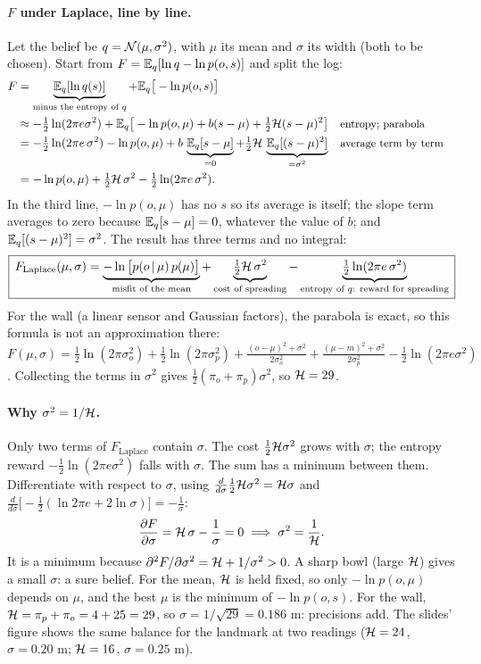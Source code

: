 \documentclass[11pt]{article}
\newcommand{\Fl}{F_{\text{Laplace}}}
\begin{document}
\paragraph{$F$ under Laplace, line by line.} Let the belief be $q = \mathcal{N}(\mu,\sigma^2)$, with $\mu$ its mean and $\sigma$ its width (both to be chosen). Start from $F = \mathbb{E}_q[\ln q - \ln p(o,s)]$ and split the log:
\begin{align*}
F &= \underbrace{\mathbb{E}_q[\ln q(s)]}_{\text{minus the entropy of }q} + \mathbb{E}_q\big[-\ln p(o,s)\big]\\
&\approx -\tfrac12\ln(2\pi e\sigma^2) + \mathbb{E}_q\big[-\ln p(o,\mu) + b(s-\mu) + \tfrac12\mathcal{H}(s-\mu)^2\big] && \text{\small entropy; parabola}\\
&= -\tfrac12\ln(2\pi e\,\sigma^2) - \ln p(o,\mu) + b\,\underbrace{\mathbb{E}_q[s-\mu]}_{=0} + \tfrac12\mathcal{H}\,\underbrace{\mathbb{E}_q[(s-\mu)^2]}_{=\sigma^2} && \text{\small average term by term}\\
&= -\ln p(o,\mu) + \tfrac12\mathcal{H}\,\sigma^2 - \tfrac12\ln(2\pi e\,\sigma^2) .
\end{align*}
In the third line, $-\ln p(o,\mu)$ has no $s$ so its average is itself; the slope term averages to zero because $\mathbb{E}_q[s-\mu] = 0$, whatever the value of $b$; and $\mathbb{E}_q[(s-\mu)^2] = \sigma^2$. The result has three terms and no integral:
\[
\boxed{\,\Fl(\mu,\sigma) = \underbrace{-\ln\big[p(o\given\mu)\,p(\mu)\big]}_{\text{misfit of the mean}} + \underbrace{\tfrac12\Hess\,\sigma^2}_{\text{cost of spreading}} - \underbrace{\tfrac12\ln(2\pi e\,\sigma^2)}_{\text{entropy of }q\text{: reward for spreading}}\,}
\]
For the wall (a linear sensor and Gaussian factors), the parabola is exact, so this formula is not an approximation there: $F(\mu,\sigma) = \tfrac12\ln(2\pi\sigma_o^2) + \tfrac12\ln(2\pi\sigma_p^2) + \frac{(o-\mu)^2 + \sigma^2}{2\sigma_o^2} + \frac{(\mu-m)^2+\sigma^2}{2\sigma_p^2} - \tfrac12\ln(2\pi e\sigma^2)$. Collecting the terms in $\sigma^2$ gives $\tfrac12(\pi_o+\pi_p)\sigma^2$, so $\mathcal{H} = 29$.

\paragraph{Why $\sigma^2 = 1/\mathcal{H}$.} Only two terms of $\Fl$ contain $\sigma$. The cost $\tfrac12\mathcal{H}\sigma^2$ grows with $\sigma$; the entropy reward $-\tfrac12\ln(2\pi e\sigma^2)$ falls with $\sigma$. The sum has a minimum between them. Differentiate with respect to $\sigma$, using $\tfrac{d}{d\sigma}\tfrac12\mathcal{H}\sigma^2 = \mathcal{H}\sigma$ and $\tfrac{d}{d\sigma}\big[-\tfrac12(\ln 2\pi e + 2\ln\sigma)\big] = -\tfrac1\sigma$:
\[
\frac{\partial F}{\partial\sigma} = \mathcal{H}\,\sigma - \frac{1}{\sigma} = 0 \;\Longrightarrow\; \sigma^2 = \frac{1}{\mathcal{H}}.
\]
It is a minimum because $\partial^2F/\partial\sigma^2 = \mathcal{H} + 1/\sigma^2 > 0$. A sharp bowl (large $\mathcal{H}$) gives a small $\sigma$: a sure belief. For the mean, $\mathcal{H}$ is held fixed, so only $-\ln p(o,\mu)$ depends on $\mu$, and the best $\mu$ is the minimum of $-\ln p(o,s)$. For the wall, $\mathcal{H} = \pi_p + \pi_o = 4 + 25 = 29$, so $\sigma = 1/\sqrt{29} = 0.186$ m: precisions add. The slides' figure shows the same balance for the landmark at two readings ($\mathcal{H} = 24$, $\sigma = 0.20$ m; $\mathcal{H} = 16$, $\sigma = 0.25$ m).
\end{document}
